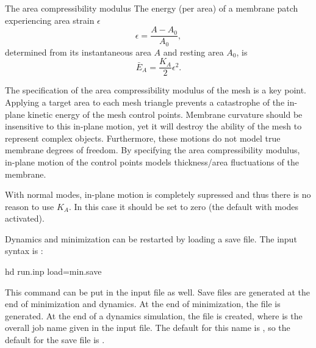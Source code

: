 \begin{bcomment}{The area compressibility modulus}
The energy (per area) of a membrane patch experiencing area strain $\epsilon$
\begin{equation}
\epsilon = \frac{A-A_0}{A_0},
\end{equation}
determined from its instantaneous area $A$ and resting area $A_0$, is
\begin{equation}
\bar{E}_A = \frac{K_A}{2} \epsilon^2.
\end{equation}
\end{bcomment}

The specification of the area compressibility modulus of the mesh is a key point.
Applying a target area to each mesh triangle prevents a catastrophe of the in-plane kinetic energy of the mesh control points.
Membrane curvature should be insensitive to this in-plane motion, yet it will destroy the ability of the mesh to represent complex objects.
Furthermore, these motions do not model true membrane degrees of freedom.
By specifying the area compressibility modulus, in-plane motion of the control points models thickness/area fluctuations of the membrane.

With normal modes, in-plane motion is completely supressed and thus there is no reason to use $K_A$.
In this case it should be set to zero (the default with modes activated).


Dynamics and minimization can be restarted by loading a save file.
The input syntax is :
\begin{command}
hd run.inp load=min.save
\end{command}
This command can be put in the input file as well.
Save files are generated at the end of minimization and dynamics.
At the end of minimization, the file  is generated.
At the end of a dynamics simulation, the file  is created, where  is the overall job name given in the input file.
The default for this name is , so the default for the save file is .




